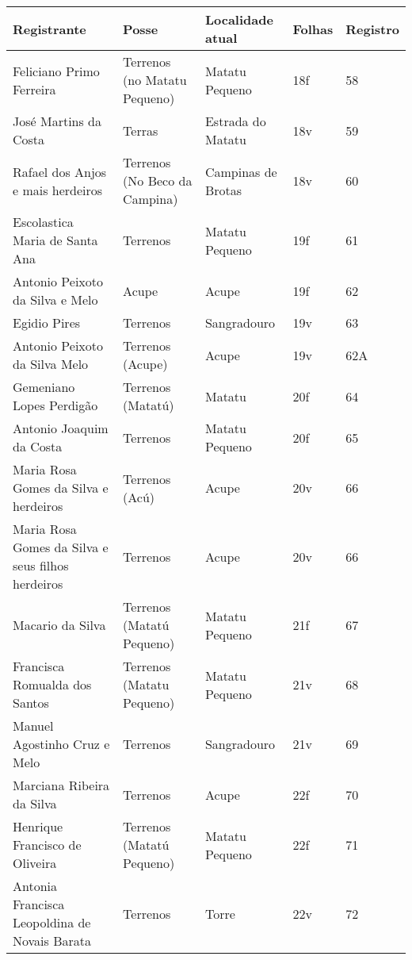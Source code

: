 \begin{table}
{
\begin{minipage}{\textwidth}
\begin{tiny}
\begin{tabular}{p{4cm}p{4cm}p{4cm}ll}
\toprule
Registrante									&Posse					&Localidade atual	 		&Folhas			&Registro		\\
\midrule
\midrule
Feliciano Primo Ferreira							&Terrenos (no Matatu Pequeno)		&Matatu Pequeno				&18f			&58			\\
José Martins da Costa								&Terras					&Estrada do Matatu			&18v			&59			\\
Rafael dos Anjos e mais herdeiros						&Terrenos (No Beco da Campina)		&Campinas de Brotas			&18v			&60			\\
Escolastica Maria de Santa Ana							&Terrenos				&Matatu Pequeno				&19f			&61			\\
Antonio Peixoto da Silva e Melo							&Acupe					&Acupe					&19f			&62			\\
Egidio Pires									&Terrenos				&Sangradouro				&19v			&63			\\
Antonio Peixoto da Silva Melo							&Terrenos (Acupe)			&Acupe					&19v			&62A			\\
Gemeniano Lopes Perdigão							&Terrenos (Matatú)			&Matatu					&20f			&64			\\
Antonio Joaquim da Costa							&Terrenos				&Matatu Pequeno				&20f			&65			\\
Maria Rosa Gomes da Silva e herdeiros						&Terrenos (Acú)				&Acupe					&20v			&66			\\
Maria Rosa Gomes da Silva e seus filhos herdeiros				&Terrenos				&Acupe					&20v			&66			\\
Macario da Silva								&Terrenos (Matatú Pequeno)		&Matatu Pequeno				&21f			&67			\\
Francisca Romualda dos Santos							&Terrenos (Matatu Pequeno)		&Matatu Pequeno				&21v			&68			\\
Manuel Agostinho Cruz e Melo							&Terrenos				&Sangradouro				&21v			&69			\\
Marciana Ribeira da Silva							&Terrenos				&Acupe					&22f			&70			\\
Henrique Francisco de Oliveira							&Terrenos (Matatú Pequeno)		&Matatu Pequeno				&22f			&71			\\
Antonia Francisca Leopoldina de Novais Barata					&Terrenos				&Torre					&22v			&72			\\

\end{tabular}
\end{tiny}
\end{minipage}}
\end{table}
